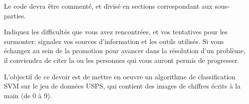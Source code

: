 \documentclass{article}
\begin{document}
\noindent Le code devra être commenté, et divisé en sections correspondant aux sous-parties. 

\noindent Indiquez les difficultés que vous avez rencontrées, et vos tentatives pour les surmonter; signalez vos sources d'information et les outils utilisés. Si vous échangez au sein de la promotion pour avancer dans la résolution d'un problème, il conviendra de citer la ou les personnes qui vous auront permis de progresser.

\newpage


L'objectif de ce devoir est de mettre en oeuvre un algorithme de classification SVM sur le jeu de données USPS, qui contient des images de chiffres écrits à la main (de 0 à 9).



\end{document}
